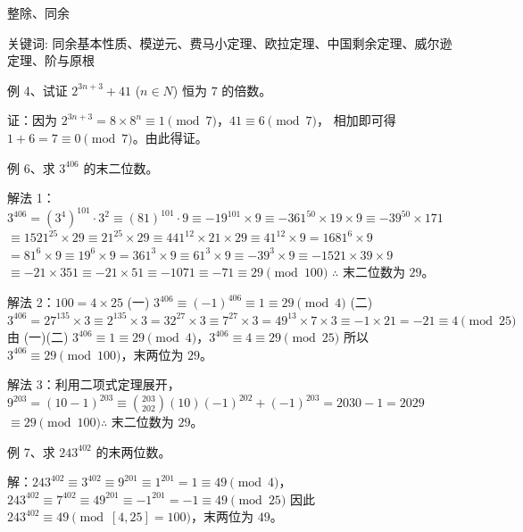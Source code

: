 \begin{center}
  {\fontsize{30pt}{26pt}\selectfont
    \hypertarget{整除、同余}{整除、同余} \label{整除、同余}
  }
\end{center}
\separator
\begin{center}
    关键词: 同余基本性质、模逆元、费马小定理、欧拉定理、中国剩余定理、威尔逊定理、阶与原根
\end{center}
\vspace{0.5pt}
\nopagecolor
\begin{questions}
    \question 例 4、试证 $2^{3n+3} + 41$ ($n \in N$) 恒为 $7$ 的倍数。

\begin{solution}
证：因为 $2^{3n+3} = 8 \times 8^n \equiv 1 \pmod 7$，$41 \equiv 6 \pmod 7$，
相加即可得 $1 + 6 = 7 \equiv 0 \pmod 7$。由此得证。
\end{solution}

\question 例 6、求 $3^{406}$ 的末二位数。

\begin{solution}
解法 1：$3^{406} = (3^4)^{101} \cdot 3^2 \equiv (81)^{101} \cdot 9 \equiv -19^{101} \times 9 \equiv -361^{50} \times 19 \times 9 \equiv -39^{50} \times 171$
$\equiv 1521^{25} \times 29 \equiv 21^{25} \times 29 \equiv 441^{12} \times 21 \times 29 \equiv 41^{12} \times 9 = 1681^6 \times 9$
$= 81^6 \times 9 \equiv 19^6 \times 9 = 361^3 \times 9 \equiv 61^3 \times 9 \equiv -39^3 \times 9 \equiv -1521 \times 39 \times 9$
$\equiv -21 \times 351 \equiv -21 \times 51 \equiv -1071 \equiv -71 \equiv 29 \pmod{100}$
$\therefore$ 末二位数为 $29$。

解法 2：$100 = 4 \times 25$
(一) $3^{406} \equiv (-1)^{406} \equiv 1 \equiv 29 \pmod 4$
(二) $3^{406} = 27^{135} \times 3 \equiv 2^{135} \times 3 = 32^{27} \times 3 \equiv 7^{27} \times 3 = 49^{13} \times 7 \times 3 \equiv -1 \times 21 = -21 \equiv 4 \pmod{25}$
由 (一)(二) $3^{406} \equiv 1 \equiv 29 \pmod 4$，$3^{406} \equiv 4 \equiv 29 \pmod{25}$
所以 $3^{406} \equiv 29 \pmod{100}$，末两位为 $29$。

解法 3：利用二项式定理展开，$9^{203} = (10-1)^{203} \equiv \binom{203}{202}(10)(-1)^{202} + (-1)^{203} = 2030 - 1 = 2029$
$\equiv 29 \pmod{100} \therefore$ 末二位数为 $29$。
\end{solution}

\question 例 7、求 $243^{402}$ 的末两位数。

\begin{solution}
解：$243^{402} \equiv 3^{402} \equiv 9^{201} \equiv 1^{201} = 1 \equiv 49 \pmod 4$，
$243^{402} \equiv 7^{402} \equiv 49^{201} \equiv -1^{201} = -1 \equiv 49 \pmod{25}$
因此 $243^{402} \equiv 49 \pmod{[4, 25]=100}$，末两位为 $49$。
\end{solution}


\end{questions}
